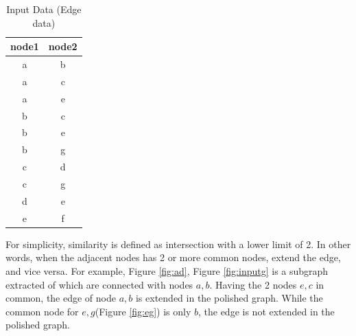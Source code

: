 \begin{table}[htbp]
\begin{center}
\caption{Input Data (Edge data)\label{tbl:input}}
\begin{tabular}{cc}
\hline
node1&node2 \\
\hline
a&b\\
a&c\\
a&e\\
b&c\\
b&e\\
b&g\\
c&d\\
c&g\\
d&e\\
e&f\\
\hline
\end{tabular} 
\end{center}
\end{table} 

For simplicity, similarity is defined as intersection with a lower limit of 2. 
In other words, when the adjacent nodes has 2 or more common nodes, extend the edge, and  vice versa. 
For example, Figure \ref{fig:ad}, Figure \ref{fig:inputg} is a subgraph extracted of which are connected with nodes $a,b$.  
Having the 2 nodes $e,c$ in common, the edge of node $a,b$  is extended in the polished graph. 
 While the common node for $e,g$(Figure \ref{fig:eg}) is only $b$, the edge is not extended in the polished graph.  

